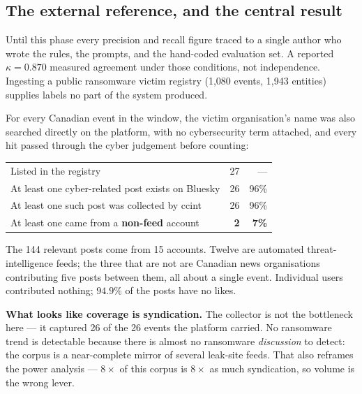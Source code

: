 \documentclass[11pt]{article}
\begin{document}
\subsection*{The external reference, and the central result}

Until this phase every precision and recall figure traced to a single author
who wrote the rules, the prompts, and the hand-coded evaluation set. A
reported $\kappa = 0.870$ measured agreement under those conditions, not
independence. Ingesting a public ransomware victim registry (1{,}080 events,
1{,}943 entities) supplies labels no part of the system produced.

For every Canadian event in the window, the victim organisation's name was
also searched directly on the platform, with no cybersecurity term attached,
and every hit passed through the cyber judgement before counting:

\begin{center}\small
\begin{tabularx}{.93\linewidth}{@{}Lrr@{}}
\toprule
{} &  &  \\
\midrule
Listed in the registry                                   & 27 & --- \\
At least one cyber-related post exists on Bluesky        & 26 & 96\% \\
At least one such post was collected by ccint            & 26 & 96\% \\
At least one came from a \textbf{non-feed} account       & \textbf{2} & \textbf{7\%} \\
\bottomrule
\end{tabularx}
\end{center}

The 144 relevant posts come from 15 accounts. Twelve are automated
threat-intelligence feeds; the three that are not are Canadian news
organisations contributing five posts between them, all about a single event.
Individual users contributed nothing; $94.9\%$ of the posts have no likes.

\begin{keybox}
\textbf{What looks like coverage is syndication.} The collector is not the
bottleneck here --- it captured 26 of the 26 events the platform carried. No
ransomware trend is detectable because there is almost no ransomware
\emph{discussion} to detect: the corpus is a near-complete mirror of several
leak-site feeds. That also reframes the power analysis --- $8\times$ of this
corpus is $8\times$ as much syndication, so volume is the wrong lever.
\end{keybox}
\end{document}
